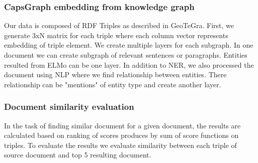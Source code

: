 \subsubsection{CapsGraph embedding from knowledge graph}
Our data is composed of RDF Triples as described in GeoTeGra\cite{patel2018geotegra}. First, we generate 3xN matrix for each triple where each column vector represents embedding of triple element. We create multiple layers for each subgraph. In one document we can create subgraph of relevant sentences or paragraphs. Entities resulted from ELMo can be one layer. In addition to NER, we also processed the document using NLP where we find relationship between entities. There relationship can be "mentions" of entity type and create another layer.

\subsubsection{Document similarity evaluation}
In the task of finding similar document for a given document, the results are calculated based on ranking of scores produces by sum of score functions on triples. To evaluate the results we evaluate similarity between each triple of source document and top 5 resulting document.
